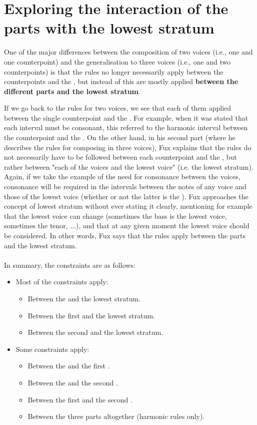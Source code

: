 \section{Exploring the interaction of the parts with the lowest stratum} \label{exploring-interaction-p-a}

One of the major differences between the composition of two voices (i.e., one \cfs and one counterpoint) and the generalisation to three voices (i.e., one \cfs and two counterpoints) is that the rules no longer necessarily apply between the counterpoints and the \cf, but instead of this are mostly applied \textbf{between the different parts and the lowest stratum}. 

If we go back to the rules for two voices, we see that each of them applied between the single counterpoint and the \cf. For example, when it was stated that each interval must be consonant, this referred to the harmonic interval between the counterpoint and the \cf.
On the other hand, in his second part (where he describes the rules for composing in three voices), Fux explains that the rules do not necessarily have to be followed between each counterpoint and the \cf, but rather between "each of the voices and the lowest voice" (i.e. the lowest stratum). Again, if we take the example of the need for consonance between the voices, consonance will be required in the intervals between the notes of any voice and those of the lowest voice (whether or not the latter is the \cf).
Fux approaches the concept of lowest stratum without ever stating it clearly, mentioning for example that the lowest voice can change (sometimes the bass is the lowest voice, sometimes the tenor, ...), and that at any given moment the lowest voice should be considered. In other words, Fux says that the rules apply between the parts and the lowest stratum.

\paragraph{}
In summary, the constraints are as follows:
\begin{itemize}
    \item Most of the constraints apply:
    \begin{itemize}
        \item Between the \cfs and the lowest stratum.
        \item Between the first \cps and the lowest stratum.
        \item Between the second \cps and the lowest stratum.
    \end{itemize}
    \item Some constraints apply:
    \begin{itemize}
        \item Between the \cfs and the first \cp.
        \item Between the \cfs and the second \cp.
        \item Between the first \cps and the second \cp.
        \item Between the three parts altogether (harmonic rules only).
    \end{itemize}

\end{itemize}


